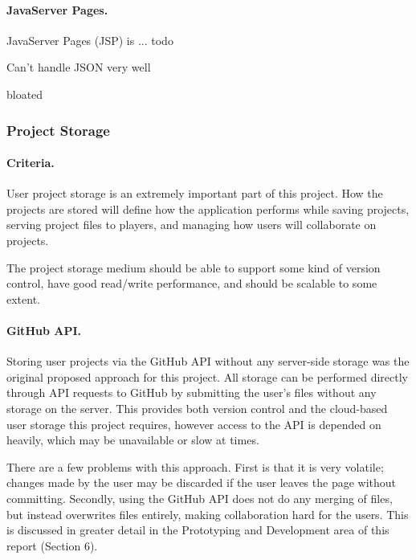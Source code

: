 \documentclass[a4paper, 12pt]{article}
\begin{document}
\paragraph{JavaServer Pages.}
JavaServer Pages (JSP) is ... todo


Can’t handle JSON very well

bloated


%
%


\subsubsection{Project Storage}
\paragraph{Criteria.}
User project storage is an extremely important part of this project. How the projects are stored will define how the application performs while saving projects, serving project files to players, and managing how users will collaborate on projects.

The project storage medium should be able to support some kind of version control, have good read/write performance, and should be scalable to some extent.

\paragraph{GitHub API.}
Storing user projects via the GitHub API without any server-side storage was the original proposed approach for this project. All storage can be performed directly through API requests to GitHub by submitting the user's files without any storage on the server. This provides both version control and the cloud-based user storage this project requires, however access to the API is depended on heavily, which may be unavailable or slow at times.


There are a few problems with this approach. First is that it is very volatile; changes made by the user may be discarded if the user leaves the page without committing. Secondly, using the GitHub API does not do any merging of files, but instead overwrites files entirely, making collaboration hard for the users. This is discussed in greater detail in the Prototyping and Development area of this report (Section 6).
\end{document}
